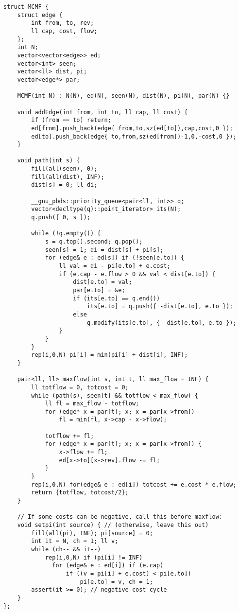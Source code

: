 \documentclass[8pt, headheight=10pt, a4paper]{article}
\begin{document}
\begin{multicols*}{3}
\begin{lstlisting}
struct MCMF {
	struct edge {
		int from, to, rev;
		ll cap, cost, flow;
	};
	int N;
	vector<vector<edge>> ed;
	vector<int> seen;
	vector<ll> dist, pi;
	vector<edge*> par;

	MCMF(int N) : N(N), ed(N), seen(N), dist(N), pi(N), par(N) {}

	void addEdge(int from, int to, ll cap, ll cost) {
		if (from == to) return;
		ed[from].push_back(edge{ from,to,sz(ed[to]),cap,cost,0 });
		ed[to].push_back(edge{ to,from,sz(ed[from])-1,0,-cost,0 });
	}

	void path(int s) {
		fill(all(seen), 0);
		fill(all(dist), INF);
		dist[s] = 0; ll di;

		__gnu_pbds::priority_queue<pair<ll, int>> q;
		vector<decltype(q)::point_iterator> its(N);
		q.push({ 0, s });

		while (!q.empty()) {
			s = q.top().second; q.pop();
			seen[s] = 1; di = dist[s] + pi[s];
			for (edge& e : ed[s]) if (!seen[e.to]) {
				ll val = di - pi[e.to] + e.cost;
				if (e.cap - e.flow > 0 && val < dist[e.to]) {
					dist[e.to] = val;
					par[e.to] = &e;
					if (its[e.to] == q.end())
						its[e.to] = q.push({ -dist[e.to], e.to });
					else
						q.modify(its[e.to], { -dist[e.to], e.to });
				}
			}
		}
		rep(i,0,N) pi[i] = min(pi[i] + dist[i], INF);
	}
    
	pair<ll, ll> maxflow(int s, int t, ll max_flow = INF) {
		ll totflow = 0, totcost = 0;
		while (path(s), seen[t] && totflow < max_flow) {
			ll fl = max_flow - totflow;
			for (edge* x = par[t]; x; x = par[x->from])
				fl = min(fl, x->cap - x->flow);

			totflow += fl;
			for (edge* x = par[t]; x; x = par[x->from]) {
				x->flow += fl;
				ed[x->to][x->rev].flow -= fl;
			}
		}
		rep(i,0,N) for(edge& e : ed[i]) totcost += e.cost * e.flow;
		return {totflow, totcost/2};
	}

	// If some costs can be negative, call this before maxflow:
	void setpi(int source) { // (otherwise, leave this out)
		fill(all(pi), INF); pi[source] = 0;
		int it = N, ch = 1; ll v;
		while (ch-- && it--)
			rep(i,0,N) if (pi[i] != INF)
			  for (edge& e : ed[i]) if (e.cap)
				  if ((v = pi[i] + e.cost) < pi[e.to])
					  pi[e.to] = v, ch = 1;
		assert(it >= 0); // negative cost cycle
	}
};
\end{lstlisting}


\end{multicols*}
\end{document}
